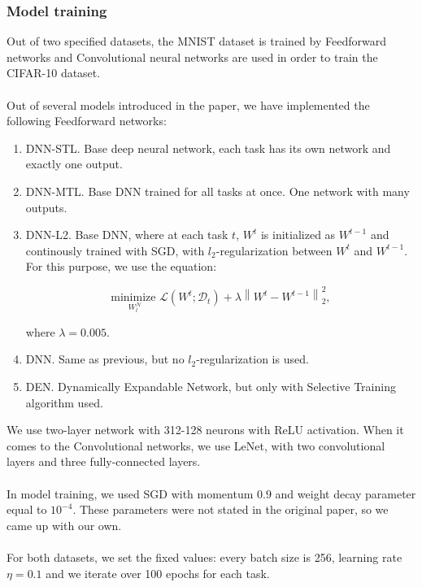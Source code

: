 \documentclass[12pt]{article}
\newcommand{\norm}[1]{\left\lVert#1\right\rVert}
\begin{document}
    \subsubsection{Model training}
    Out of two specified datasets, the MNIST dataset is trained by Feedforward networks and Convolutional
    neural networks are used in order to train the CIFAR-10 dataset.
    \\
    \\
    Out of several models introduced in the paper, we have implemented the following Feedforward networks:
    \begin{enumerate}  
        \item DNN-STL. Base deep neural network, each task has its own network and exactly one output.
        \item DNN-MTL. Base DNN trained for all tasks at once. One network with many outputs.
        \item DNN-L2. Base DNN, where at each task $t$, $W^{t}$ is initialized as $W^{t-1}$ and continously
        trained with SGD, with $l_{2}$-regularization between $W^{t}$ and $W^{t-1}$. For this purpose, we use
        the equation:

        $$ \underset{W_{l}^{\mathcal{N}}}{\text{minimize }} \mathcal{L}(W^{t}; \mathcal{D}_{t}) + \lambda \norm{W^{t} - W^{t-1}}^{2}_{2}, $$

        where $\lambda = 0.005$.

        \item DNN. Same as previous, but no $l_{2}$-regularization is used.
        \item DEN. Dynamically Expandable Network, but only with Selective Training algorithm used.   
    \end{enumerate}
    \bigskip
    We use two-layer network with 312-128 neurons with ReLU activation.
    When it comes to the Convolutional networks, we use LeNet, with two convolutional layers
    and three fully-connected layers.
    \\
    \\
    In model training, we used SGD with momentum $0.9$ and weight decay parameter equal to $10^{-4}$.
    These parameters were not stated in the original paper, so we came up with our own.
    \\
    \\
    For both datasets, we set the fixed values: every batch size is 256, learning rate $\eta = 0.1$ and
    we iterate over 100 epochs for each task.
    
\end{document}
